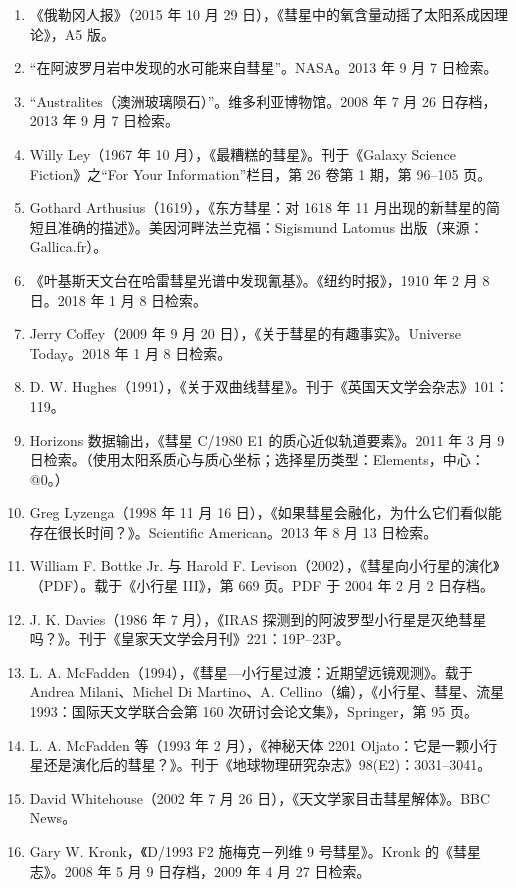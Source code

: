 \begin{enumerate}
\item 《俄勒冈人报》（2015 年 10 月 29 日），《彗星中的氧含量动摇了太阳系成因理论》，A5 版。
\item “在阿波罗月岩中发现的水可能来自彗星”。NASA。2013 年 9 月 7 日检索。
\item “Australites（澳洲玻璃陨石）”。维多利亚博物馆。2008 年 7 月 26 日存档，2013 年 9 月 7 日检索。
\item Willy Ley（1967 年 10 月），《最糟糕的彗星》。刊于《Galaxy Science Fiction》之“For Your Information”栏目，第 26 卷第 1 期，第 96–105 页。
\item Gothard Arthusius（1619），《东方彗星：对 1618 年 11 月出现的新彗星的简短且准确的描述》。美因河畔法兰克福：Sigismund Latomus 出版（来源：Gallica.fr）。
\item 《叶基斯天文台在哈雷彗星光谱中发现氰基》。《纽约时报》，1910 年 2 月 8 日。2018 年 1 月 8 日检索。
\item Jerry Coffey（2009 年 9 月 20 日），《关于彗星的有趣事实》。Universe Today。2018 年 1 月 8 日检索。
\item D. W. Hughes（1991），《关于双曲线彗星》。刊于《英国天文学会杂志》101：119。
\item Horizons 数据输出，《彗星 C/1980 E1 的质心近似轨道要素》。2011 年 3 月 9 日检索。（使用太阳系质心与质心坐标；选择星历类型：Elements，中心：@0。）
\item Greg Lyzenga（1998 年 11 月 16 日），《如果彗星会融化，为什么它们看似能存在很长时间？》。Scientific American。2013 年 8 月 13 日检索。
\item William F. Bottke Jr. 与 Harold F. Levison（2002），《彗星向小行星的演化》（PDF）。载于《小行星 III》，第 669 页。PDF 于 2004 年 2 月 2 日存档。
\item J. K. Davies（1986 年 7 月），《IRAS 探测到的阿波罗型小行星是灭绝彗星吗？》。刊于《皇家天文学会月刊》221：19P–23P。
\item L. A. McFadden（1994），《彗星—小行星过渡：近期望远镜观测》。载于 Andrea Milani、Michel Di Martino、A. Cellino（编），《小行星、彗星、流星 1993：国际天文学联合会第 160 次研讨会论文集》，Springer，第 95 页。
\item L. A. McFadden 等（1993 年 2 月），《神秘天体 2201 Oljato：它是一颗小行星还是演化后的彗星？》。刊于《地球物理研究杂志》98(E2)：3031–3041。
\item David Whitehouse（2002 年 7 月 26 日），《天文学家目击彗星解体》。BBC News。
\item Gary W. Kronk，《D/1993 F2 施梅克－列维 9 号彗星》。Kronk 的《彗星志》。2008 年 5 月 9 日存档，2009 年 4 月 27 日检索。

\end{enumerate}
